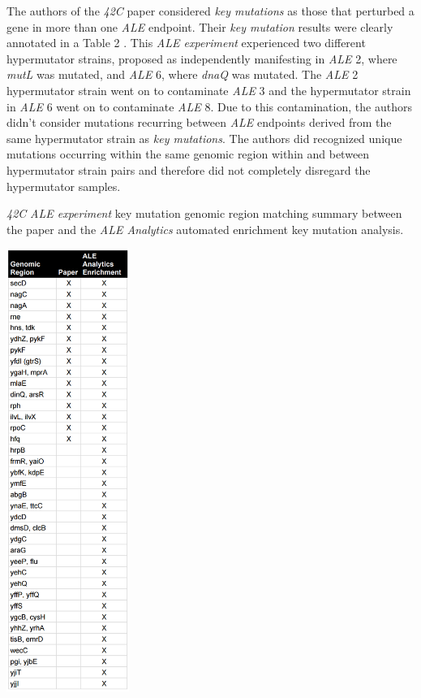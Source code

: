 \documentclass[12pt,final,masters,chapterheads]{ucsd}  %
\begin{document}
The authors of the \textit{42C} paper considered \textit{key mutations} as those that perturbed a gene in more than one \textit{ALE} endpoint. Their \textit{key mutation} results were clearly annotated in a Table 2 \cite{pmid25015645}. This \textit{ALE experiment} experienced two different hypermutator strains, proposed as independently manifesting in \textit{ALE} 2, where \textit{mutL} was mutated, and \textit{ALE} 6, where \textit{dnaQ} was mutated. The \textit{ALE} 2 hypermutator strain went on to contaminate \textit{ALE} 3 and the hypermutator strain in \textit{ALE} 6 went on to contaminate \textit{ALE} 8. Due to this contamination, the authors didn't consider mutations recurring between \textit{ALE} endpoints derived from the same hypermutator strain as \textit{key mutations}. The authors did recognized unique mutations occurring within the same genomic region within and between hypermutator strain pairs and therefore did not completely disregard the hypermutator samples.
\begin{table}[H]
  \caption{\textit{42C} \textit{ALE experiment} {key mutation} genomic region matching summary between the paper and the \textit{ALE Analytics} automated {enrichment key mutation} analysis.}
  \centering
  \includegraphics[width=0.3\textwidth]{42c_key_mutation_regions.png}
\end{table}
\end{document}
